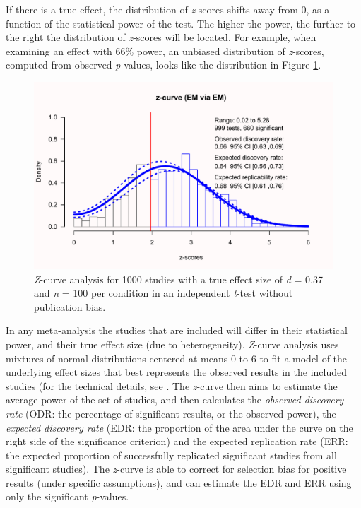 \documentclass[
  oneside]{krantz}
\begin{document}
If there is a true effect, the distribution of \emph{z}-scores shifts away from 0, as a function of the statistical power of the test. The higher the power, the further to the right the distribution of \emph{z}-scores will be located. For example, when examining an effect with 66\% power, an unbiased distribution of \emph{z}-scores, computed from observed \emph{p}-values, looks like the distribution in Figure \ref{fig:zcurveunbiasedalternative}.



\begin{figure}

{\centering \includegraphics[width=1\linewidth]{12-bias_files/figure-latex/zcurveunbiasedalternative-1} 

}

\caption{\emph{Z}-curve analysis for 1000 studies with a true effect size of \emph{d} = 0.37 and \emph{n} = 100 per condition in an independent \emph{t}-test without publication bias.}\label{fig:zcurveunbiasedalternative}
\end{figure}

In any meta-analysis the studies that are included will differ in their statistical power, and their true effect size (due to heterogeneity). \emph{Z}-curve analysis uses mixtures of normal distributions centered at means 0 to 6 to fit a model of the underlying effect sizes that best represents the observed results in the included studies (for the technical details, see \citet{bartos_z-curve20_2020}. The \emph{z}-curve then aims to estimate the average power of the set of studies, and then calculates the \emph{observed discovery rate} (ODR: the percentage of significant results, or the observed power), the \emph{expected discovery rate} (EDR: the proportion of the area under the curve on the right side of the significance criterion) and the expected replication rate (ERR: the expected proportion of successfully replicated significant studies from all significant studies). The \emph{z}-curve is able to correct for selection bias for positive results (under specific assumptions), and can estimate the EDR and ERR using only the significant \emph{p}-values.
\end{document}
